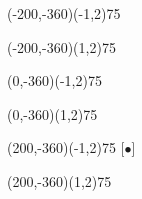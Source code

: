 \documentclass[12pt]{article}
\begin{document}
\begin{figure}[htb]
\begin{egame}
\renewcommand{\egarrowstyle}{}

\putbranch(-200,-360)(-1,2){75}

\renewcommand{\egarrowstyle}{}

\putbranch(-200,-360)(1,2){75}





\renewcommand{\egarrowstyle}{}

\putbranch(0,-360)(-1,2){75}

\renewcommand{\egarrowstyle}{}

\putbranch(0,-360)(1,2){75}




\renewcommand{\egarrowstyle}{e}

\putbranch(200,-360)(-1,2){75}
[$\bullet$]

\renewcommand{\egarrowstyle}{}

\putbranch(200,-360)(1,2){75}






\end{egame}
\end{figure}
\end{document}
